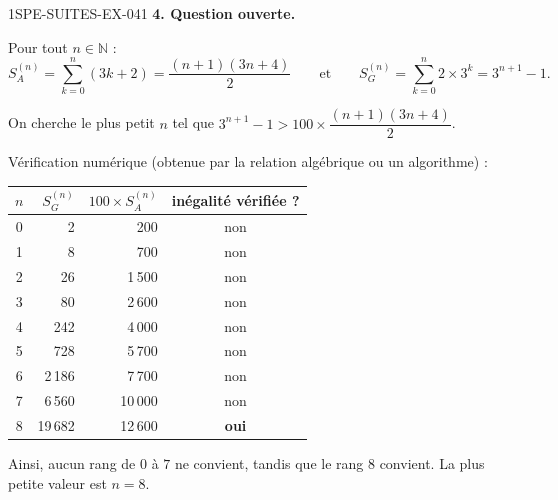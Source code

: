 \begin{corrige}{1SPE-SUITES-EX-041}
\textbf{4. Question ouverte.}


Pour tout $n \in \mathbb{N}$ :
\[
S_A^{(n)} = \sum_{k=0}^{n} (3k+2) = \frac{(n+1)(3n+4)}{2} \qquad \text{et} \qquad S_G^{(n)} = \sum_{k=0}^{n} 2 \times 3^k = 3^{n+1} - 1.
\]

On cherche le plus petit $n$ tel que $3^{n+1} - 1 > 100 \times \dfrac{(n+1)(3n+4)}{2}$.

Vérification numérique (obtenue par la relation algébrique ou un algorithme) :

\begin{center}
\begin{tabular}{c|r|r|c}
$n$ & $S_G^{(n)}$ & $100 \times S_A^{(n)}$ & inégalité vérifiée ? \\
\hline
0 & 2 & 200 & non \\
1 & 8 & 700 & non \\
2 & 26 & 1\,500 & non \\
3 & 80 & 2\,600 & non \\
4 & 242 & 4\,000 & non \\
5 & 728 & 5\,700 & non \\
6 & 2\,186 & 7\,700 & non \\
7 & 6\,560 & 10\,000 & non \\
8 & 19\,682 & 12\,600 & \textbf{oui} \\
\end{tabular}
\end{center}

Ainsi, aucun rang de $0$ à $7$ ne convient, tandis que le rang $8$ convient.
La plus petite valeur est $\boxed{n = 8}$.

\end{corrige}
